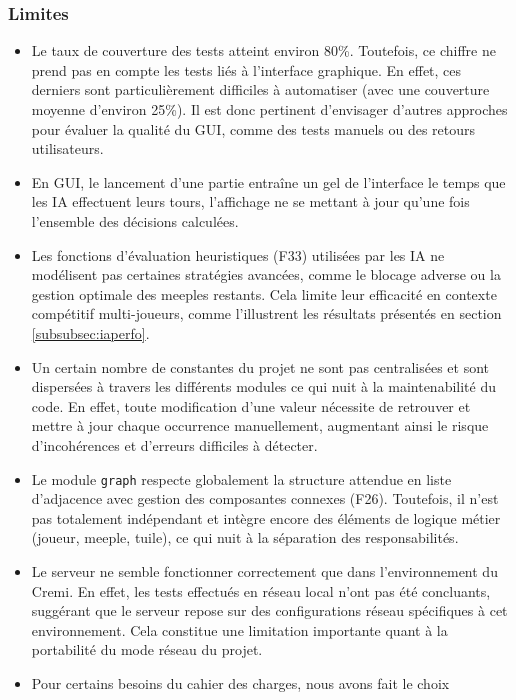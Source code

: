 \documentclass[11pt]{article}
\begin{document}
\subsubsection{Limites}
\begin{itemize}
  \item [$\bullet$] Le taux de couverture des tests atteint environ 80\%. Toutefois, ce chiffre ne prend pas en compte les tests liés à l’interface graphique. 
  En effet, ces derniers sont particulièrement difficiles à automatiser (avec une couverture moyenne d’environ 25\%). 
  Il est donc pertinent d’envisager d’autres approches pour évaluer la qualité du GUI, comme des tests manuels ou des retours utilisateurs.
  \item [$\bullet$] En GUI, le lancement d'une partie entraîne un gel de 
  l'interface le temps que les IA effectuent leurs tours, l'affichage 
  ne se mettant à jour qu'une fois l'ensemble des décisions calculées.
  \item [$\bullet$] Les fonctions d'évaluation heuristiques (F33) utilisées par 
  les IA ne modélisent pas certaines stratégies avancées, comme le blocage 
  adverse ou la gestion optimale des meeples restants. Cela limite leur 
  efficacité en contexte compétitif multi-joueurs, comme l'illustrent les 
  résultats présentés en section \ref{subsubsec:iaperfo}.
  \item [$\bullet$]  Un certain nombre de constantes du projet ne sont pas 
  centralisées et sont dispersées à travers les différents modules ce qui 
  nuit à la maintenabilité du code. En effet, toute modification d'une 
  valeur nécessite de retrouver et mettre à jour chaque occurrence 
  manuellement, augmentant ainsi le risque d'incohérences et d'erreurs 
  difficiles à détecter.
  \item [$\bullet$]  Le module \texttt{graph} respecte globalement la structure 
  attendue en liste d’adjacence avec gestion des composantes connexes (F26). 
  Toutefois, il n’est pas totalement indépendant et intègre encore des éléments 
  de logique métier (joueur, meeple, tuile), ce qui nuit à la séparation des 
  responsabilités.
  \item [$\bullet$]  Le serveur ne semble fonctionner correctement que dans 
  l'environnement du Cremi. En effet, les tests effectués en réseau local 
  n'ont pas été concluants, suggérant que le serveur repose sur des 
  configurations réseau spécifiques à cet environnement. Cela constitue 
  une limitation importante quant à la portabilité du mode réseau du projet.
  \item [$\bullet$] Pour certains besoins du cahier des charges, nous avons fait le choix 

\end{itemize}
\end{document}

